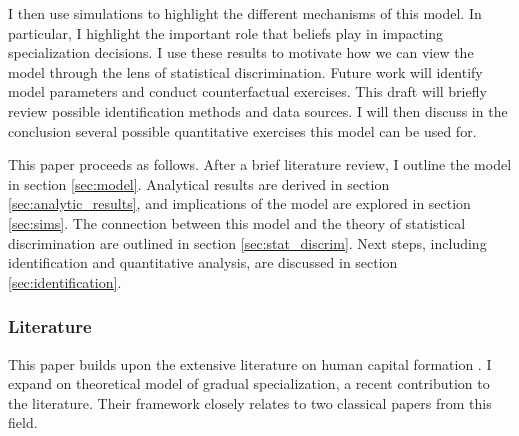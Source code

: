 I then use simulations to highlight the different mechanisms of this model.
In particular, I highlight the important role that beliefs play in impacting specialization decisions.
I use these results to motivate how we can view the model through the lens of statistical discrimination. 
Future work will identify model parameters and conduct counterfactual exercises. 
This draft will briefly review possible identification methods and data sources. 
I will then discuss in the conclusion several possible quantitative exercises this model can be used for. 


This paper proceeds as follows. After a brief literature review, I outline the model in section \ref{sec:model}. Analytical results are derived in section \ref{sec:analytic_results}, and implications of the model are explored in section \ref{sec:sims}. The connection between this model and the theory of statistical discrimination are outlined in section \ref{sec:stat_discrim}. Next steps, including identification and quantitative analysis, are discussed in section \ref{sec:identification}.

\subsubsection*{Literature}

This paper builds upon the extensive literature on human capital formation \parencite{B62,B67,M74,R83}. 
I expand on  theoretical model of gradual specialization, a recent contribution to the literature. 
Their framework closely relates to two classical papers from this field.

